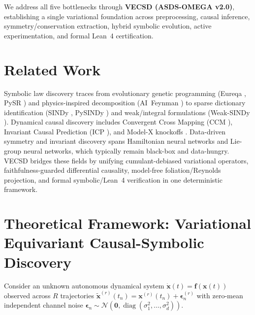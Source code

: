 \documentclass[11pt,a4paper]{article}
\begin{document}
We address all five bottlenecks through \textbf{VECSD (ASDS-OMEGA v2.0)}, establishing a single variational foundation across preprocessing, causal inference, symmetry/conservation extraction, hybrid symbolic evolution, active experimentation, and formal Lean~4 certification.

\section{Related Work}
Symbolic law discovery traces from evolutionary genetic programming (Eureqa \cite{schmidt2009distilling}, PySR \cite{cranmer2023pysr}) and physics-inspired decomposition (AI~Feynman \cite{udrescu2020ai}) to sparse dictionary identification (SINDy \cite{brunton2016discovering}, PySINDy \cite{desilva2020pysindy}) and weak/integral formulations (Weak-SINDy \cite{messenger2021weak}). Dynamical causal discovery includes Convergent Cross Mapping (CCM \cite{sugihara2012detecting}), Invariant Causal Prediction (ICP \cite{peters2016causal}), and Model-X knockoffs \cite{candes2018panning}. Data-driven symmetry and invariant discovery spans Hamiltonian neural networks and Lie-group neural networks, which typically remain black-box and data-hungry. VECSD bridges these fields by unifying cumulant-debiased variational operators, faithfulness-guarded differential causality, model-free foliation/Reynolds projection, and formal symbolic/Lean~4 verification in one deterministic framework.

\section{Theoretical Framework: Variational Equivariant Causal-Symbolic Discovery}
Consider an unknown autonomous dynamical system $\dot{\mathbf{x}}(t) = \mathbf{f}(\mathbf{x}(t))$ observed across $R$ trajectories $\tilde{\mathbf{x}}^{(r)}(t_n) = \mathbf{x}^{(r)}(t_n) + \boldsymbol{\epsilon}_n^{(r)}$ with zero-mean independent channel noise $\boldsymbol{\epsilon}_n \sim \mathcal{N}(\mathbf{0}, \operatorname{diag}(\sigma_1^2,\dots,\sigma_d^2))$.
\end{document}
